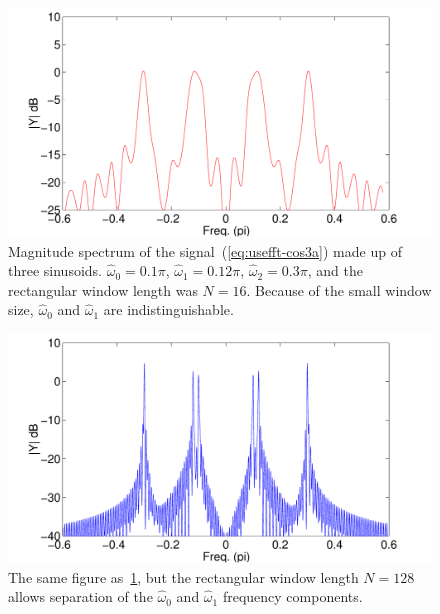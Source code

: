 \begin{figure}
\centerline{\includegraphics[width=6in]{ch-fft/ufft_cos3_rWX_16}}
\caption[Magnitude spectrum of the 
signal~(\protect\ref{eq:usefft-cos3a}) made up of three
sinusoids]{Magnitude spectrum of the
signal~(\protect\ref{eq:usefft-cos3a}) made up of three sinusoids.
$\hat{\omega}_0=0.1\pi$, $\hat{\omega}_1=0.12\pi$,
$\hat{\omega}_2=0.3\pi$, and the rectangular window length was
$N=16$. Because of the small window size, $\hat{\omega}_0$ and
$\hat{\omega}_1$ are indistinguishable.\label{fig:usefft-rWX3-1}}
\end{figure}

\begin{figure}
\centerline{\includegraphics[width=6in]{ch-fft/ufft_cos3_rWX_128}}
\caption[The same figure as~\protect\ref{fig:usefft-rWX3-1}, but with
rectangular window length $N=128$]{The same figure
as~\protect\ref{fig:usefft-rWX3-1}, but the rectangular window length
$N=128$ allows separation of the $\hat{\omega}_0$ and $\hat{\omega}_1$
frequency components.\label{fig:usefft-rWX3-2}}
\end{figure}

